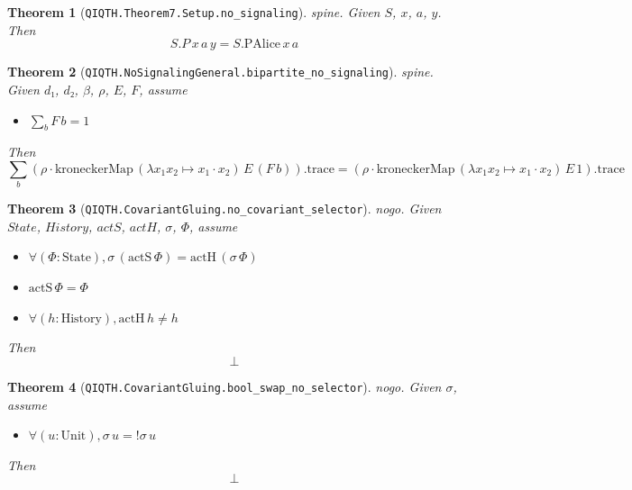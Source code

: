 \documentclass[11pt]{article}
\newtheorem{theorem}{Theorem}[section]
\begin{document}
\begin{theorem}[\texttt{QIQTH.Theorem7.Setup.no\_signaling}]\label{thm:qiqth-theorem7-setup-no-signaling}
\textit{spine.}
Given $S$, $x$, $a$, $y$.
Then \[ S.P\,x\,a\,y = S.\mathrm{PAlice}\,x\,a \]
\end{theorem}


\begin{theorem}[\texttt{QIQTH.NoSignalingGeneral.bipartite\_no\_signaling}]\label{thm:qiqth-nosignalinggeneral-bipartite-no-signaling}
\textit{spine.}
Given $d₁$, $d₂$, $β$, $ρ$, $E$, $F$,
assume
\begin{itemize}
  \item[\rm(hF)] $\sum_{b} F\,b = 1$
\end{itemize}
Then \[ \sum_{b} (\rho \cdot \mathrm{kroneckerMap}\,(\lambda x_{1} x_{2} \mapsto x_{1} \cdot x_{2})\,E\,(F\,b)).\mathrm{trace} = (\rho \cdot \mathrm{kroneckerMap}\,(\lambda x_{1} x_{2} \mapsto x_{1} \cdot x_{2})\,E\,1).\mathrm{trace} \]
\end{theorem}


\begin{theorem}[\texttt{QIQTH.CovariantGluing.no\_covariant\_selector}]\label{thm:qiqth-covariantgluing-no-covariant-selector}
\textit{nogo.}
Given $State$, $History$, $actS$, $actH$, $σ$, $Φ$,
assume
\begin{itemize}
  \item[\rm(equiv)] $\forall (\Phi : \mathrm{State}), \sigma\,(\mathrm{actS}\,\Phi) = \mathrm{actH}\,(\sigma\,\Phi)$
  \item[\rm(hΦ)] $\mathrm{actS}\,\Phi = \Phi$
  \item[\rm(hno)] $\forall (h : \mathrm{History}), \mathrm{actH}\,h \ne h$
\end{itemize}
Then \[ \bot \]
\end{theorem}


\begin{theorem}[\texttt{QIQTH.CovariantGluing.bool\_swap\_no\_selector}]\label{thm:qiqth-covariantgluing-bool-swap-no-selector}
\textit{nogo.}
Given $σ$,
assume
\begin{itemize}
  \item[\rm(equiv)] $\forall (u : \mathrm{Unit}), \sigma\,u = !\sigma\,u$
\end{itemize}
Then \[ \bot \]
\end{theorem}
\end{document}
